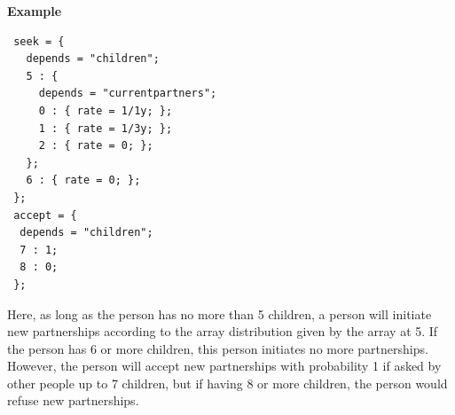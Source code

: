 \documentclass[11pt]{article}
\newenvironment{example}{\par\smallskip\noindent\begingroup\small\textbf{\small Example\enskip}}{\endgroup\par\smallskip}
\begin{document}
\begin{example}
\begin{verbatim}
 seek = {
   depends = "children";
   5 : { 
     depends = "currentpartners";
     0 : { rate = 1/1y; };
     1 : { rate = 1/3y; };
     2 : { rate = 0; };
   };
   6 : { rate = 0; };
 };
 accept = {
  depends = "children";
  7 : 1;
  8 : 0;
 };
\end{verbatim}
Here, as long as the person has no more than 5 children, a person will initiate
new partnerships according to the array distribution given by the array at 5.
If the person has 6 or more children, this person initiates no more
partnerships. However, the person will accept new partnerships with probability
1 if asked by other people up to 7 children, but if having 8 or more children,
the person would refuse new partnerships.
\end{example}

\newenvironment{wideitemize}{
    \begin{flushleft}\begin{list}{}
    {\renewcommand{\makelabel}{\entrylabel}
	\setlength{\itemsep}{0ex}
    \setlength{\labelwidth}{15em}
    \setlength{\leftmargin}{15.48em}
  }}%
{\end{list}\end{flushleft}}
\end{document}
